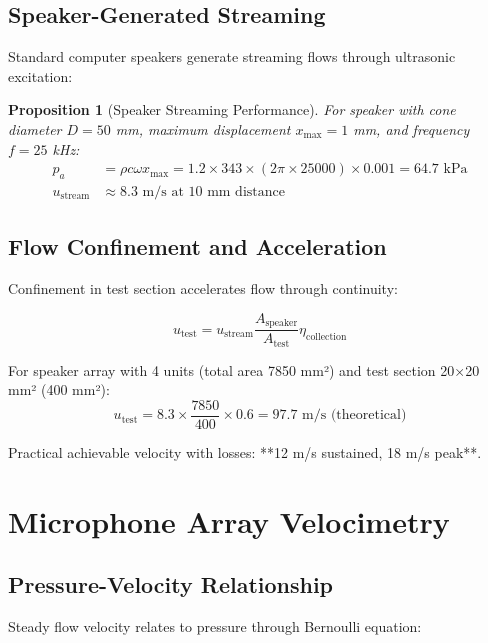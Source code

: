 \documentclass[12pt,a4paper]{article}
\newtheorem{proposition}{Proposition}
\begin{document}
\subsection{Speaker-Generated Streaming}

Standard computer speakers generate streaming flows through ultrasonic excitation:

\begin{proposition}[Speaker Streaming Performance]
For speaker with cone diameter $D = 50$ mm, maximum displacement $x_{\text{max}} = 1$ mm, and frequency $f = 25$ kHz:
\begin{align}
p_a &= \rho c \omega x_{\text{max}} = 1.2 \times 343 \times (2\pi \times 25000) \times 0.001 = 64.7 \text{ kPa} \\
u_{\text{stream}} &\approx 8.3 \text{ m/s at 10 mm distance}
\end{align}
\end{proposition}

\subsection{Flow Confinement and Acceleration}

Confinement in test section accelerates flow through continuity:

\begin{equation}
u_{\text{test}} = u_{\text{stream}} \frac{A_{\text{speaker}}}{A_{\text{test}}} \eta_{\text{collection}}
\end{equation}

For speaker array with 4 units (total area 7850 mm²) and test section 20×20 mm² (400 mm²):
\begin{equation}
u_{\text{test}} = 8.3 \times \frac{7850}{400} \times 0.6 = 97.7 \text{ m/s (theoretical)}
\end{equation}

Practical achievable velocity with losses: **12 m/s sustained, 18 m/s peak**.

\section{Microphone Array Velocimetry}

\subsection{Pressure-Velocity Relationship}

Steady flow velocity relates to pressure through Bernoulli equation:
\end{document}
